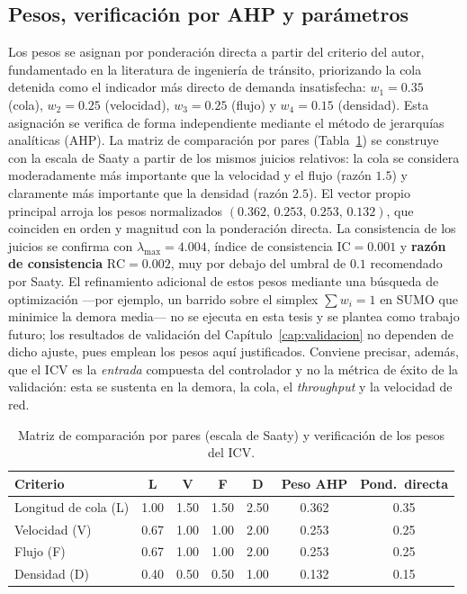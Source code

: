 \subsection{Pesos, verificación por AHP y parámetros}\label{subsec:icv-pesos}

Los pesos se asignan por ponderación directa a partir del criterio del autor, fundamentado en la
literatura de ingeniería de tránsito, priorizando la cola detenida como el indicador más directo
de demanda insatisfecha: $w_{1}=0.35$ (cola), $w_{2}=0.25$ (velocidad), $w_{3}=0.25$ (flujo) y
$w_{4}=0.15$ (densidad). Esta asignación se verifica de forma independiente mediante el método de
jerarquías analíticas (AHP). La matriz de comparación por pares (Tabla~\ref{tab:ahp}) se construye
con la escala de Saaty a partir de los mismos juicios relativos: la cola se considera moderadamente
más importante que la velocidad y el flujo (razón $1.5$) y claramente más importante que la densidad
(razón $2.5$). El vector propio principal arroja los pesos normalizados
$(0.362,\,0.253,\,0.253,\,0.132)$, que coinciden en orden y magnitud con la ponderación directa. La
consistencia de los juicios se confirma con $\lambda_{\max}=4.004$, índice de consistencia
$\mathrm{IC}=0.001$ y \textbf{razón de consistencia} $\mathrm{RC}=0.002$, muy por debajo del umbral
de $0.1$ recomendado por Saaty. El refinamiento adicional de estos pesos mediante una búsqueda de
optimización —por ejemplo, un barrido sobre el simplex $\sum w_{i}=1$ en SUMO que minimice la demora
media— no se ejecuta en esta tesis y se plantea como trabajo futuro; los resultados de validación del
Capítulo~\ref{cap:validacion} no dependen de dicho ajuste, pues emplean los pesos aquí justificados.
Conviene precisar, además, que el ICV es la \emph{entrada} compuesta del controlador y no la métrica
de éxito de la validación: esta se sustenta en la demora, la cola, el \textit{throughput} y la
velocidad de red.

\begin{table}[H]
  \centering
  \footnotesize
  \caption{Matriz de comparación por pares (escala de Saaty) y verificación de los pesos del ICV.}
  \label{tab:ahp}
  \begin{tabular}{@{}lcccccc@{}}
    \toprule
    \textbf{Criterio} & \textbf{L} & \textbf{V} & \textbf{F} & \textbf{D} & \textbf{Peso AHP} & \textbf{Pond.\ directa} \\
    \midrule
    Longitud de cola (L) & 1.00 & 1.50 & 1.50 & 2.50 & 0.362 & 0.35 \\
    Velocidad (V)        & 0.67 & 1.00 & 1.00 & 2.00 & 0.253 & 0.25 \\
    Flujo (F)            & 0.67 & 1.00 & 1.00 & 2.00 & 0.253 & 0.25 \\
    Densidad (D)         & 0.40 & 0.50 & 0.50 & 1.00 & 0.132 & 0.15 \\
    \bottomrule
  \end{tabular}
\end{table}

